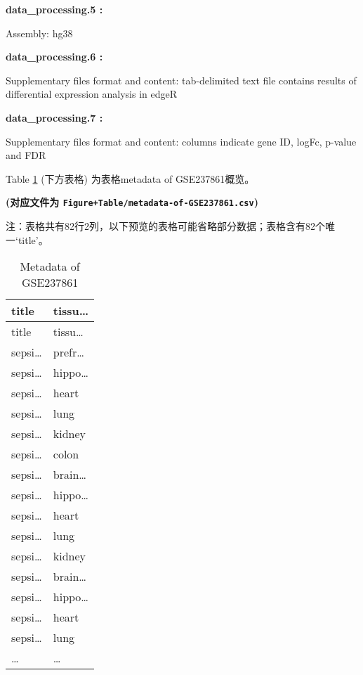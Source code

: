 \documentclass[
]{article}
\begin{document}
\begin{center}
\begin{tcolorbox}[colback=gray!10, colframe=gray!50, width=0.9\linewidth, arc=1mm, boxrule=0.5pt]
\vspace{2em}


\textbf{
data\_processing.5
:}

\vspace{0.5em}

    Assembly: hg38

\vspace{2em}


\textbf{
data\_processing.6
:}

\vspace{0.5em}

    Supplementary files format and content: tab-delimited
text file contains results of differential expression
analysis in edgeR

\vspace{2em}


\textbf{
data\_processing.7
:}

\vspace{0.5em}

    Supplementary files format and content: columns
indicate gene ID, logFc, p-value and FDR

\vspace{2em}
\end{tcolorbox}
\end{center}

Table \ref{tab:metadata-of-GSE237861} (下方表格) 为表格metadata of GSE237861概览。

\textbf{(对应文件为 \texttt{Figure+Table/metadata-of-GSE237861.csv})}

\begin{center}\begin{tcolorbox}[colback=gray!10, colframe=gray!50, width=0.9\linewidth, arc=1mm, boxrule=0.5pt]注：表格共有82行2列，以下预览的表格可能省略部分数据；表格含有82个唯一`title'。
\end{tcolorbox}
\end{center}

\begin{longtable}[]{@{}ll@{}}
\caption{\label{tab:metadata-of-GSE237861}Metadata of GSE237861}\tabularnewline
\toprule
title & tissu\ldots{}\tabularnewline
\midrule
\endfirsthead
\toprule
title & tissu\ldots{}\tabularnewline
\midrule
\endhead
sepsi\ldots{} & prefr\ldots{}\tabularnewline
sepsi\ldots{} & hippo\ldots{}\tabularnewline
sepsi\ldots{} & heart\tabularnewline
sepsi\ldots{} & lung\tabularnewline
sepsi\ldots{} & kidney\tabularnewline
sepsi\ldots{} & colon\tabularnewline
sepsi\ldots{} & brain\ldots{}\tabularnewline
sepsi\ldots{} & hippo\ldots{}\tabularnewline
sepsi\ldots{} & heart\tabularnewline
sepsi\ldots{} & lung\tabularnewline
sepsi\ldots{} & kidney\tabularnewline
sepsi\ldots{} & brain\ldots{}\tabularnewline
sepsi\ldots{} & hippo\ldots{}\tabularnewline
sepsi\ldots{} & heart\tabularnewline
sepsi\ldots{} & lung\tabularnewline
\ldots{} & \ldots{}\tabularnewline
\bottomrule
\end{longtable}
\end{document}

